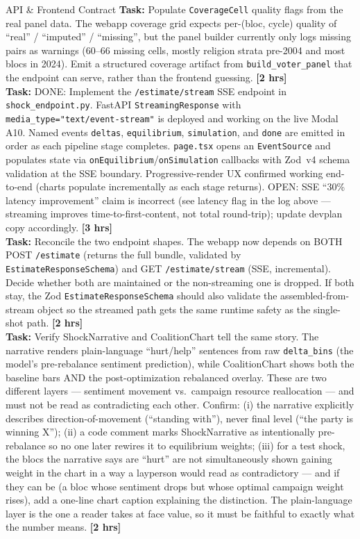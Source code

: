 \documentclass[11pt]{article}
\newcommand{\hrs}[1]{\textbf{[#1 hrs]}}
\newcommand{\task}[2]{%
  \noindent\textbf{Task:} #1 \hfill \hrs{#2}\\}
\begin{document}
\begin{taskbox}{API \& Frontend Contract}
\task{Populate \texttt{CoverageCell} quality flags from the real panel
  data. The webapp coverage grid expects per-(bloc, cycle) quality of
  ``real'' / ``imputed'' / ``missing'', but the panel builder currently only
  logs missing pairs as warnings (60--66 missing cells, mostly religion
  strata pre-2004 and most blocs in 2024). Emit a structured coverage
  artifact from \texttt{build\_voter\_panel} that the endpoint can serve,
  rather than the frontend guessing.}{2}

\task{DONE: Implement the \texttt{/estimate/stream} SSE endpoint in
  \texttt{shock\_endpoint.py}. FastAPI \texttt{StreamingResponse} with
  \texttt{media\_type="text/event-stream"} is deployed and working on the
  live Modal A10. Named events \texttt{deltas}, \texttt{equilibrium},
  \texttt{simulation}, and \texttt{done} are emitted in order as each
  pipeline stage completes. \texttt{page.tsx} opens an \texttt{EventSource}
  and populates state via \texttt{onEquilibrium}/\texttt{onSimulation}
  callbacks with Zod~v4 schema validation at the SSE boundary.
  Progressive-render UX confirmed working end-to-end (charts populate
  incrementally as each stage returns). OPEN: SSE ``30\% latency
  improvement'' claim is incorrect (see latency flag in the log above ---
  streaming improves time-to-first-content, not total round-trip); update
  devplan copy accordingly.}{3}

\task{Reconcile the two endpoint shapes. The webapp now depends on BOTH
  POST \texttt{/estimate} (returns the full bundle, validated by
  \texttt{EstimateResponseSchema}) and GET \texttt{/estimate/stream} (SSE,
  incremental). Decide whether both are maintained or the non-streaming
  one is dropped. If both stay, the Zod \texttt{EstimateResponseSchema}
  should also validate the assembled-from-stream object so the streamed
  path gets the same runtime safety as the single-shot path.}{2}

\task{Verify ShockNarrative and CoalitionChart tell the same story. The
  narrative renders plain-language ``hurt/help'' sentences from raw
  \texttt{delta\_bins} (the model's pre-rebalance sentiment prediction),
  while CoalitionChart shows both the baseline bars AND the
  post-optimization rebalanced overlay. These are two different layers ---
  sentiment movement vs.\ campaign resource reallocation --- and must not
  be read as contradicting each other. Confirm: (i) the narrative
  explicitly describes direction-of-movement (``standing with''), never
  final level (``the party is winning X''); (ii) a code comment marks
  ShockNarrative as intentionally pre-rebalance so no one later rewires it
  to equilibrium weights; (iii) for a test shock, the blocs the narrative
  says are ``hurt'' are not simultaneously shown gaining weight in the
  chart in a way a layperson would read as contradictory --- and if they
  can be (a bloc whose sentiment drops but whose optimal campaign weight
  rises), add a one-line chart caption explaining the distinction. The
  plain-language layer is the one a reader takes at face value, so it must
  be faithful to exactly what the number means.}{2}


\end{taskbox}
\end{document}

